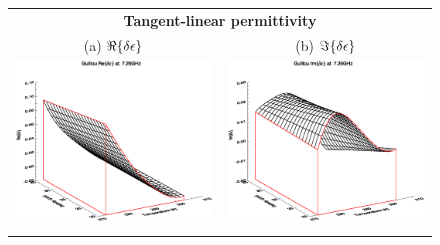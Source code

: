 \begin{figure}[htp]
  \centering
  \begin{tabular}{c c}
    \multicolumn{2}{c}{\sffamily\textbf{Tangent-linear permittivity}}\\
    \textsf{(a)} $\Re\{\delta\epsilon\}$ &
    \textsf{(b)} $\Im\{\delta\epsilon\}$ \\
    \includegraphics[bb=125 240 508 540,clip,scale=0.5]{graphics/Guillou/TLAD/e_TL_re_7.25GHz.eps} &
    \includegraphics[bb=125 240 508 540,clip,scale=0.5]{graphics/Guillou/TLAD/e_TL_im_7.25GHz.eps} \\\\

\end{tabular}
\end{figure}
